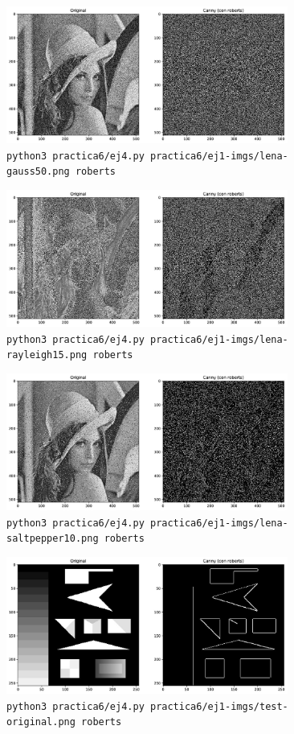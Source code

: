 \documentclass[11pt, spanish]{article}
\begin{document}
\begin{figure}[H]
\centering
    \includegraphics[height=4.5cm]{informe-imgs/ej4-roberts-lena-gauss50.jpg}
    \caption{\texttt{python3 practica6/ej4.py practica6/ej1-imgs/lena-gauss50.png roberts}}
\end{figure}

\begin{figure}[H]
\centering
    \includegraphics[height=4.5cm]{informe-imgs/ej4-roberts-lena-rayleigh15.jpg}
    \caption{\texttt{python3 practica6/ej4.py practica6/ej1-imgs/lena-rayleigh15.png roberts}}
\end{figure}

\begin{figure}[H]
\centering
    \includegraphics[height=4.5cm]{informe-imgs/ej4-roberts-lena-saltpepper10.jpg}
    \caption{\texttt{python3 practica6/ej4.py practica6/ej1-imgs/lena-saltpepper10.png roberts}}
\end{figure}


\begin{figure}[H]
\centering
    \includegraphics[height=4.5cm]{informe-imgs/ej4-roberts-test-original.jpg}
    \caption{\texttt{python3 practica6/ej4.py practica6/ej1-imgs/test-original.png roberts}}
\end{figure}
\end{document}
